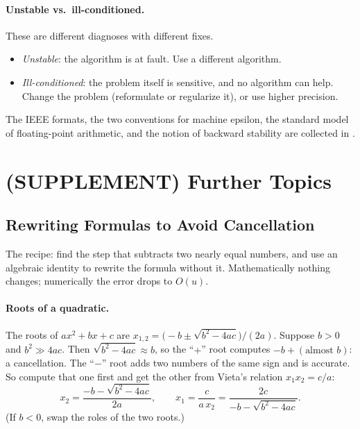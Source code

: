 \paragraph{Unstable vs.\ ill-conditioned.} These are different diagnoses with different fixes.
\begin{itemize}
  \item \emph{Unstable}: the algorithm is at fault. Use a different algorithm.
  \item \emph{Ill-conditioned}: the problem itself is sensitive, and no algorithm can help. Change the problem (reformulate or regularize it), or use higher precision.
\end{itemize}

The IEEE formats, the two conventions for machine epsilon, the standard model of floating-point arithmetic, and the notion of backward stability are collected in .

\clearpage
\section{(SUPPLEMENT) Further Topics}
\label{sec:fp-further}
\subsection{Rewriting Formulas to Avoid Cancellation}

The recipe: find the step that subtracts two nearly equal numbers, and use an algebraic identity to rewrite the formula without it. Mathematically nothing changes; numerically the error drops to $O(u)$.

\paragraph{Roots of a quadratic.} The roots of $ax^2 + bx + c$ are $x_{1,2} = \bigl(-b \pm \sqrt{b^2 - 4ac}\bigr)/(2a)$. Suppose $b > 0$ and $b^2 \gg 4ac$. Then $\sqrt{b^2 - 4ac} \approx b$, so the ``$+$'' root computes $-b + (\text{almost } b)$: a cancellation. The ``$-$'' root adds two numbers of the same sign and is accurate. So compute that one first and get the other from Vieta's relation $x_1x_2 = c/a$:
\begin{equation}
  x_2 = \frac{-b - \sqrt{b^2 - 4ac}}{2a}, \qquad x_1 = \frac{c}{a\,x_2} = \frac{2c}{-b - \sqrt{b^2 - 4ac}}.
\end{equation}
(If $b < 0$, swap the roles of the two roots.)

